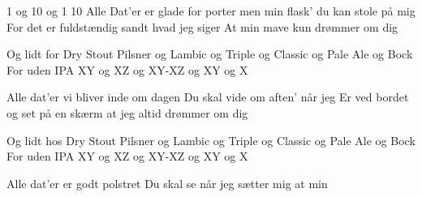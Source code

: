1 og 10 og 1 10
Alle Dat'er er glade for porter
men min flask' du kan stole på mig
For det er fuldstændig sandt hvad jeg siger
At min mave kun drømmer om dig

Og lidt for Dry Stout
Pilsner og Lambic
og Triple og Classic
og Pale Ale og Bock
For uden IPA
XY og XZ
og XY-XZ
og XY og X

Alle dat'er vi bliver inde om dagen
Du skal vide om aften' når jeg
Er ved bordet og set på en skærm
at jeg altid drømmer om dig

Og lidt hos Dry Stout
Pilsner og Lambic
og Triple og Classic
og Pale Ale og Bock
For uden IPA
XY og XZ
og XY-XZ
og XY og X

Alle dat'er er godt polstret
Du skal se når jeg sætter mig
at min 